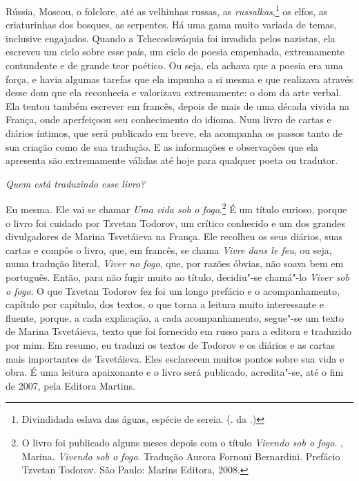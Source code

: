 Rússia, Moscou, o folclore, até as velhinhas russas, as
\emph{russalkas},\footnote{Divindidada eslava das águas, espécie de
  sereia. (. da .)} os elfos, as criaturinhas dos bosques, as
serpentes. Há uma gama muito variada de temas, inclusive engajados.
Quando a Tchecoslováquia foi invadida pelos nazistas, ela escreveu um
ciclo sobre esse país, um ciclo de poesia empenhada, extremamente
contundente e de grande teor poético. Ou seja, ela achava que a poesia
era uma força, e havia algumas tarefas que ela impunha a si mesma e que
realizava através desse dom que ela reconhecia e valorizava
extremamente: o dom da arte verbal. Ela tentou também escrever em
francês, depois de mais de uma década vivida na França, onde aperfeiçoou
seu conhecimento do idioma. Num livro de cartas e diários íntimos, que
será publicado em breve, ela acompanha os passos tanto de sua criação
como de sua tradução. E as informações e observações que ela apresenta
são extremamente válidas até hoje para qualquer poeta ou tradutor.

\medskip

\emph{Quem está traduzindo esse livro?}

Eu mesma. Ele vai se chamar \emph{Uma vida sob o
fogo}.\footnote{O livro foi publicado alguns meses depois com o título
  \emph{Vivendo sob o fogo}. , Marina. \emph{Vivendo sob o
  fogo}. Tradução Aurora Fornoni Bernardini. Prefácio Tzvetan Todorov.
  São Paulo: Marins Editora, 2008.} É um título curioso, porque o livro
foi cuidado por Tzvetan Todorov, um crítico conhecido e um dos grandes
divulgadores de Marina Tsvetáieva na França. Ele recolheu os seus
diários, suas cartas e compôs o livro, que, em francês, se chama
\emph{Vivre dans le feu}, ou seja, numa tradução literal, \emph{Viver no
fogo}, que, por razões óbvias, não soava bem em português. Então, para
não fugir muito ao título, decidiu"-se chamá"-lo \emph{Viver sob o fogo}.
O que Tzvetan Todorov fez foi um longo prefácio e o acompanhamento,
capítulo por capítulo, dos textos, o que torna a leitura muito
interessante e fluente, porque, a cada explicação, a cada
acompanhamento, segue"-se um texto de Marina Tsvetáieva, texto que foi
fornecido em russo para a editora e traduzido por mim. Em resumo, eu
traduzi os textos de Todorov e os diários e as cartas mais importantes
de Tsvetáieva. Eles esclarecem muitos pontos sobre sua vida e obra. É
uma leitura apaixonante e o livro será publicado, acredita"-se, até o fim
de 2007, pela Editora Martins.

